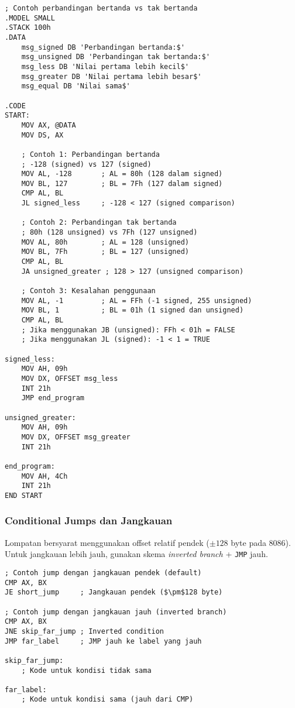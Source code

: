 \documentclass[../main.tex]{subfiles}
\begin{document}
\begin{lstlisting}[language={[x86masm]Assembler}, caption=Contoh Perbandingan Bertanda vs Tak Bertanda, label={lst:signed-unsigned-ch08}]
; Contoh perbandingan bertanda vs tak bertanda
.MODEL SMALL
.STACK 100h
.DATA
    msg_signed DB 'Perbandingan bertanda:$'
    msg_unsigned DB 'Perbandingan tak bertanda:$'
    msg_less DB 'Nilai pertama lebih kecil$'
    msg_greater DB 'Nilai pertama lebih besar$'
    msg_equal DB 'Nilai sama$'
    
.CODE
START:
    MOV AX, @DATA
    MOV DS, AX
    
    ; Contoh 1: Perbandingan bertanda
    ; -128 (signed) vs 127 (signed)
    MOV AL, -128       ; AL = 80h (128 dalam signed)
    MOV BL, 127        ; BL = 7Fh (127 dalam signed)
    CMP AL, BL
    JL signed_less     ; -128 < 127 (signed comparison)
    
    ; Contoh 2: Perbandingan tak bertanda
    ; 80h (128 unsigned) vs 7Fh (127 unsigned)
    MOV AL, 80h        ; AL = 128 (unsigned)
    MOV BL, 7Fh        ; BL = 127 (unsigned)
    CMP AL, BL
    JA unsigned_greater ; 128 > 127 (unsigned comparison)
    
    ; Contoh 3: Kesalahan penggunaan
    MOV AL, -1         ; AL = FFh (-1 signed, 255 unsigned)
    MOV BL, 1          ; BL = 01h (1 signed dan unsigned)
    CMP AL, BL
    ; Jika menggunakan JB (unsigned): FFh < 01h = FALSE
    ; Jika menggunakan JL (signed): -1 < 1 = TRUE
    
signed_less:
    MOV AH, 09h
    MOV DX, OFFSET msg_less
    INT 21h
    JMP end_program
    
unsigned_greater:
    MOV AH, 09h
    MOV DX, OFFSET msg_greater
    INT 21h
    
end_program:
    MOV AH, 4Ch
    INT 21h
END START
\end{lstlisting}

            \subsubsection{Conditional Jumps dan Jangkauan}
Lompatan bersyarat menggunakan offset relatif pendek (\(\pm 128\) byte pada 8086). Untuk jangkauan lebih jauh, gunakan skema \textit{inverted branch} + \texttt{JMP} jauh.

\begin{lstlisting}[language={[x86masm]Assembler}, caption=Contoh Jangkauan Jump dan Inverted Branch, label={lst:jump-range}]
; Contoh jump dengan jangkauan pendek (default)
CMP AX, BX
JE short_jump     ; Jangkauan pendek ($\pm$128 byte)

; Contoh jump dengan jangkauan jauh (inverted branch)
CMP AX, BX
JNE skip_far_jump ; Inverted condition
JMP far_label     ; JMP jauh ke label yang jauh

skip_far_jump:
    ; Kode untuk kondisi tidak sama
    
far_label:
    ; Kode untuk kondisi sama (jauh dari CMP)
\end{lstlisting}
\end{document}
